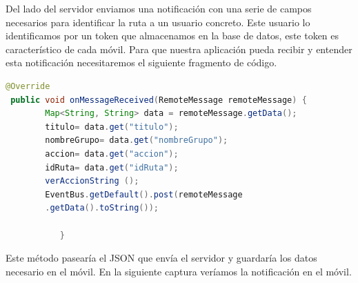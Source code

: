 Del lado del servidor enviamos una notificación con una serie de campos necesarios para identificar la ruta a un usuario concreto. Este usuario lo identificamos por un token que almacenamos en la base de datos, este token es característico de cada móvil. Para que nuestra aplicación  pueda recibir y entender esta notificación necesitaremos el siguiente fragmento de código.
	\begin{lstlisting}[language=java,caption={Recepción de mensajes},label=DescriptiveLabel]
 @Override
 public void onMessageReceived(RemoteMessage remoteMessage) {
        Map<String, String> data = remoteMessage.getData();
        titulo= data.get("titulo");
        nombreGrupo= data.get("nombreGrupo");
        accion= data.get("accion");
        idRuta= data.get("idRuta");
        verAccionString ();
        EventBus.getDefault().post(remoteMessage
        .getData().toString());
      
           }
\end{lstlisting}
Este método pasearía el JSON que envía el servidor y guardaría los datos necesario en el móvil.
En la siguiente captura veríamos la notificación en el móvil.	
	
